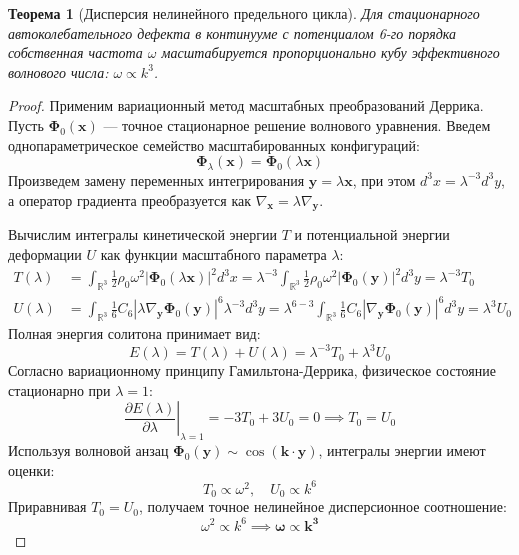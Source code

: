 \documentclass[12pt,a4paper]{article}
\newtheorem{theorem}{Теорема}
\begin{document}
	\begin{theorem}[Дисперсия нелинейного предельного цикла]
		Для стационарного автоколебательного дефекта в континууме с потенциалом 6-го порядка собственная частота $\omega$ масштабируется пропорционально кубу эффективного волнового числа: $\omega \propto k^3$.
	\end{theorem}
	
	\begin{proof}
		Применим вариационный метод масштабных преобразований Деррика. Пусть $\boldsymbol{\Phi}_0(\mathbf{x})$ — точное стационарное решение волнового уравнения. Введем однопараметрическое семейство масштабированных конфигураций:
		\begin{equation}
			\boldsymbol{\Phi}_\lambda(\mathbf{x}) = \boldsymbol{\Phi}_0(\lambda \mathbf{x})
		\end{equation}
		Произведем замену переменных интегрирования $\mathbf{y} = \lambda \mathbf{x}$, при этом $d^3x = \lambda^{-3} d^3y$, а оператор градиента преобразуется как $\nabla_\mathbf{x} = \lambda \nabla_\mathbf{y}$. 
		
		Вычислим интегралы кинетической энергии $T$ и потенциальной энергии деформации $U$ как функции масштабного параметра $\lambda$:
		\begin{align}
			T(\lambda) &= \int_{\mathbb{R}^3} \frac{1}{2} \rho_0 \omega^2 |\boldsymbol{\Phi}_0(\lambda \mathbf{x})|^2 d^3x = \lambda^{-3} \int_{\mathbb{R}^3} \frac{1}{2} \rho_0 \omega^2 |\boldsymbol{\Phi}_0(\mathbf{y})|^2 d^3y = \lambda^{-3} T_0 \\
			U(\lambda) &= \int_{\mathbb{R}^3} \frac{1}{6} C_6 |\lambda \nabla_\mathbf{y} \boldsymbol{\Phi}_0(\mathbf{y})|^6 \lambda^{-3} d^3y = \lambda^{6 - 3} \int_{\mathbb{R}^3} \frac{1}{6} C_6 |\nabla_\mathbf{y} \boldsymbol{\Phi}_0(\mathbf{y})|^6 d^3y = \lambda^3 U_0
		\end{align}
		Полная энергия солитона принимает вид:
		\begin{equation}
			E(\lambda) = T(\lambda) + U(\lambda) = \lambda^{-3} T_0 + \lambda^3 U_0
		\end{equation}
		Согласно вариационному принципу Гамильтона-Деррика, физическое состояние стационарно при $\lambda = 1$:
		\begin{equation}
			\left. \frac{\partial E(\lambda)}{\partial \lambda} \right|_{\lambda=1} = -3 T_0 + 3 U_0 = 0 \implies T_0 = U_0
		\end{equation}
		Используя волновой анзац $\boldsymbol{\Phi}_0(\mathbf{y}) \sim \cos(\mathbf{k} \cdot \mathbf{y})$, интегралы энергии имеют оценки:
		\begin{equation}
			T_0 \propto \omega^2, \quad U_0 \propto k^6
		\end{equation}
		Приравнивая $T_0 = U_0$, получаем точное нелинейное дисперсионное соотношение:
		\begin{equation}
			\omega^2 \propto k^6 \implies \mathbf{\omega \propto k^3}
		\end{equation}
	\end{proof}
	
\end{document}
